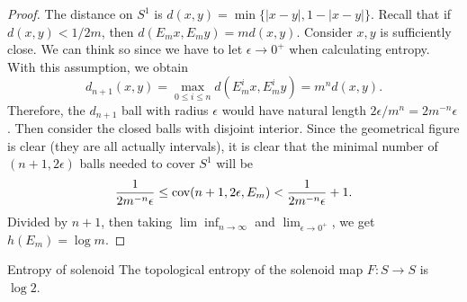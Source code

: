 \documentclass[12pt,a4paper]{article}
\begin{document}
	\begin{proof}
		The distance on $S^1$ is $d(x,y)=\min\{|x-y|, 1-|x-y|\}$. Recall that if $d(x,y)<1/2m$, then $d(E_m x, E_m y)=md(x,y)$. Consider $x,y$ is sufficiently close. We can think so since we have to let $\epsilon\to 0^+$ when calculating entropy. With this assumption, we obtain 
		$$
		d_{n+1} (x,y) = \max_{0\leq i\leq n} d(E_m^i x, E_m^i y) = m^{n}d(x,y).
		$$
		Therefore, the $d_{n+1}$ ball with radius $\epsilon$ would have natural length $2\epsilon/m^n = 2m^{-n}\epsilon$. Then consider the closed balls with disjoint interior. Since the geometrical figure is clear (they are all actually intervals), it is clear that the minimal number of $(n+1,2\epsilon)$ balls needed to cover $S^1$ will be 
		$$
		\frac{1}{2m^{-n}\epsilon}\leq \text{cov} (n+1,2\epsilon,E_m)<\frac{1}{2m^{-n}\epsilon}+1.
		$$
		Divided by $n+1$, then taking $\lim\inf_{n\to\infty}$ and $\lim_{\epsilon\to 0^+}$, we get $h(E_m)=\log m$.
	\end{proof}
	
	
	
	
	
	
	\begin{proposition}{Entropy of solenoid}{}
		The topological entropy of the solenoid map $F:S\to S$ is $\log2$.
	\end{proposition}
	
\end{document}
